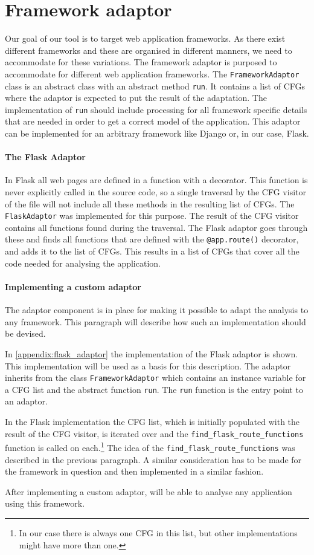 \section{Framework adaptor}\label{framework_adaptor}
Our goal of our tool is to target web application frameworks.
As there exist different frameworks and these are organised in different manners, we need to accommodate for these variations.
The framework adaptor is purposed to accommodate for different web application frameworks.
The \texttt{FrameworkAdaptor} class is an abstract class with an abstract method \texttt{run}.
It contains a list of CFGs where the adaptor is expected to put the result of the adaptation.
The implementation of \texttt{run} should include processing for all framework specific details that are needed in order to get a correct model of the application.
This adaptor can be implemented for an arbitrary framework like Django or, in our case, Flask.

\paragraph{The Flask Adaptor}
In Flask all web pages are defined in a function with a decorator.
This function is never explicitly called in the source code, so a single traversal by the CFG visitor of the file will not include all these methods in the resulting list of CFGs.
The \texttt{FlaskAdaptor} was implemented for this purpose.
The result of the CFG visitor contains all functions found during the traversal.
The Flask adaptor goes through these and finds all functions that are defined with the \texttt{@app.route()} decorator, and adds it to the list of CFGs.
This results in a list of CFGs that cover all the code needed for analysing the application.

\paragraph{Implementing a custom adaptor}
The adaptor component is in place for making it possible to adapt the analysis to any framework.
This paragraph will describe how such an implementation should be devised.

In \cref{appendix:flask_adaptor} the implementation of the Flask adaptor is shown.
This implementation will be used as a basis for this description.
The adaptor inherits from the class \texttt{FrameworkAdaptor} which contains an instance variable for a CFG list and the abstract function \texttt{run}.
The \texttt{run} function is the entry point to an adaptor.

In the Flask implementation the CFG list, which is initially populated with the result of the CFG visitor, is iterated over and the \texttt{find\_flask\_route\_functions} function is called on each.\footnote{In our case there is always one CFG in this list, but other implementations might have more than one.}
The idea of the \texttt{find\_flask\_route\_functions} was described in the previous paragraph.
A similar consideration has to be made for the framework in question and then implemented in a similar fashion.

After implementing a custom adaptor, \pyt{} will be able to analyse any application using this framework.
